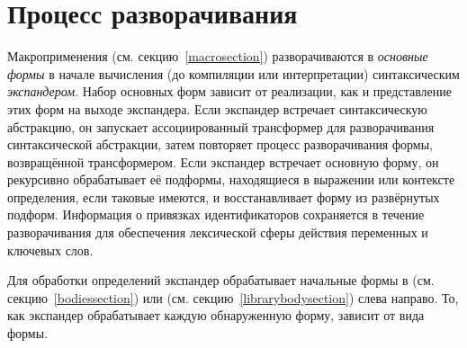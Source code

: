 \chapter{Процесс разворачивания}
\label{expansionchapter}

Макроприменения (см. секцию~\ref{macrosection}) разворачиваются в \textit{основные формы}
 в начале вычисления (до компиляции или интерпретации)
синтаксическим \emph{экспандером}. Набор основных форм зависит от реализации, как и
представление этих форм на выходе экспандера. Если экспандер
встречает синтаксическую абстракцию, он запускает ассоциированный трансформер для
разворачивания синтаксической абстракции, затем повторяет процесс разворачивания формы, возвращённой
трансформером. Если экспандер встречает основную форму, он рекурсивно
обрабатывает её подформы, находящиеся в выражении или контексте определения, если таковые
имеются, и восстанавливает форму из развёрнутых подформ. Информация о привязках
идентификаторов сохраняется в течение разворачивания для обеспечения лексической сферы действия
переменных и ключевых слов.

Для обработки определений экспандер обрабатывает начальные формы в 
(см. секцию~\ref{bodiessection}) или  (см. секцию~\ref{librarybodysection})
слева направо. То, как экспандер обрабатывает каждую обнаруженную форму, зависит от
вида формы.

